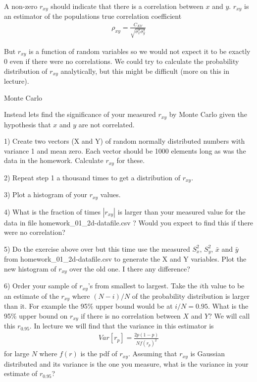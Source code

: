 \documentclass[11pt]{beamer}
\begin{document}
\begin{frame}
A non-zero $r_{xy}$ should indicate that there is a correlation between $x$ and $y$.
$r_{xy}$ is an estimator of the populations true correlation coefficient
\begin{align}
\rho_{xy} = \frac{C_{XY}}{\sqrt{\sigma^2_x \sigma_y^2} }
\end{align}

But $r_{xy}$ is a function of random variables so we would not expect it to be exactly 0 
even if there were no correlations.  We could try to calculate the probability distribution of 
$r_{xy}$ analytically, but this might be difficult (more on this in lecture).
\end{frame}
\begin{frame}
{\large Monte Carlo}

Instead lets find the significance of your measured $r_{xy}$ by Monte Carlo given the hypothesis that 
$x$ and $y$ are not correlated.

\vspace{1cm}
1) Create two vectors (X and Y) of random normally distributed numbers with variance 1 and mean zero.  Each vector should be 1000 elements long as was the data in the homework.  Calculate $r_{xy}$ for these.

\vspace{1cm}
2) Repeat step 1 a thousand times to get a distribution of $r_{xy}$.

\vspace{1cm}
3) Plot a histogram of your  $r_{xy}$ values.
\end{frame}
\begin{frame}
4) What is the fraction of times $|r_{xy}|$ is larger than your measured value for the data in file homework\_01\_2d-datafile.csv ?  Would you expect to find this if there were no correlation?

\vspace{1cm}

5) Do the exercise above over but this time use the measured $S^2_x$, $S^2_y$, $\bar{x}$ and $\bar{y}$ from homework\_01\_2d-datafile.csv  to generate the  X and Y variables.   Plot the new histogram of $r_{xy}$ over the old one.   I there any difference?
\end{frame}
\begin{frame}
6) Order your sample of $r_{xy}$'s from smallest to largest.  Take the $i$th value to be an estimate of the $r_{xy}$ where $(N-i)/N$ of the probability distribution is larger than it.  For example the 95\% upper bound would be at $i/N = 0.95$.  What is the 95\% upper bound on $r_{xy}$ if there is no correlation between $X$ and $Y$?  We will call this $r_{0.95}$.
In lecture we will find that the variance in this estimator is
\begin{align}
Var[r_p] = \frac{2 p (1-p) }{N f(r_p)^2 }
\end{align}
for large $N$ where $f(r)$ is the pdf of $r_{xy}$. 
Assuming that $r_{xy}$ is Gaussian distributed and its variance is the one you measure, what is the variance in your estimate of $r_{0.95}$?
\end{frame}
\end{document}
